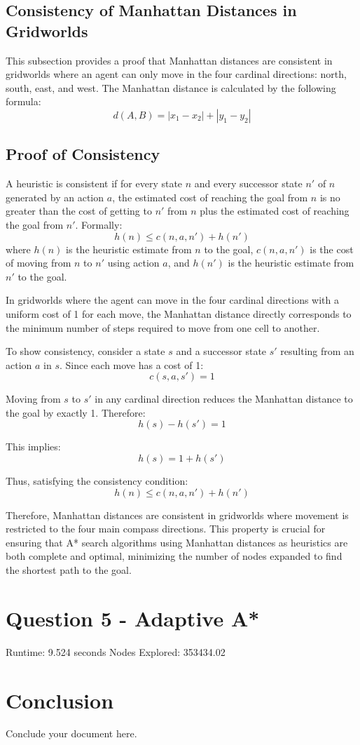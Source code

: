 \documentclass{article}
\begin{document}
\subsection{Consistency of Manhattan Distances in Gridworlds}
This subsection provides a proof that Manhattan distances are consistent in gridworlds where an agent can only move in the four cardinal directions: north, south, east, and west. The Manhattan distance is calculated by the following formula: \[d(A, B) = |x_1 - x_2| + |y_1 - y_2|\]

\subsection{Proof of Consistency}

A heuristic is consistent if for every state \(n\) and every successor state \(n'\) of \(n\) generated by an action \(a\), the estimated cost of reaching the goal from \(n\) is no greater than the cost of getting to \(n'\) from \(n\) plus the estimated cost of reaching the goal from \(n'\). Formally:
\[h(n) \leq c(n, a, n') + h(n')\]
where \(h(n)\) is the heuristic estimate from \(n\) to the goal, \(c(n, a, n')\) is the cost of moving from \(n\) to \(n'\) using action \(a\), and \(h(n')\) is the heuristic estimate from \(n'\) to the goal.

In gridworlds where the agent can move in the four cardinal directions with a uniform cost of 1 for each move, the Manhattan distance directly corresponds to the minimum number of steps required to move from one cell to another. 

To show consistency, consider a state \(s\) and a successor state \(s'\) resulting from an action \(a\) in \(s\). Since each move has a cost of 1:
\[c(s, a, s') = 1\]

Moving from \(s\) to \(s'\) in any cardinal direction reduces the Manhattan distance to the goal by exactly 1. Therefore:
\[h(s) - h(s') = 1\]

This implies:
\[h(s) = 1 + h(s')\]

Thus, satisfying the consistency condition:
\[h(n) \leq c(n, a, n') + h(n')\]

Therefore, Manhattan distances are consistent in gridworlds where movement is restricted to the four main compass directions. This property is crucial for ensuring that A* search algorithms using Manhattan distances as heuristics are both complete and optimal, minimizing the number of nodes expanded to find the shortest path to the goal.


\section{Question 5 - Adaptive A*}
Runtime: 9.524 seconds
Nodes Explored: 353434.02

\section{Conclusion}
Conclude your document here.
\end{document}
